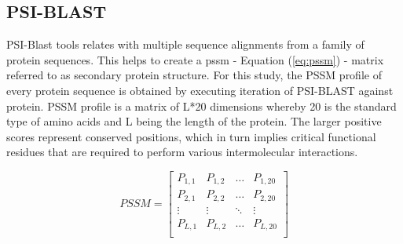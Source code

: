   \subsection{PSI-BLAST}
  PSI-Blast tools relates with multiple sequence alignments from a family of protein sequences\citep{Schaffer2001}. This helps to create a \acrshort{pssm} - Equation (\ref{eq:pssm}) - matrix referred to as secondary protein structure. For this study, the PSSM profile of every protein sequence is obtained by executing iteration of PSI-BLAST against \cite[KEGG]{Schaffer2001} protein. PSSM profile is a matrix of L*20 dimensions whereby 20 is the standard type of amino acids and L being the length of the protein. The larger positive scores represent conserved positions, which in turn implies critical functional residues that are required to perform various intermolecular interactions.\cite[PSSM]{Schaffer2001}
  
  \begin{equation}
    PSSM = \begin{bmatrix}
      P_{1,1} & P_{1,2} & \dots & P_{1,20} \\
      P_{2,1} & P_{2,2} & \dots & P_{2,20} \\
      \vdots  & \vdots  & \ddots & \vdots \\
      P_{L,1} & P_{L,2} & \dots & P_{L,20} \\
    \end{bmatrix}
    \label{eq:pssm}
  \end{equation}
  
